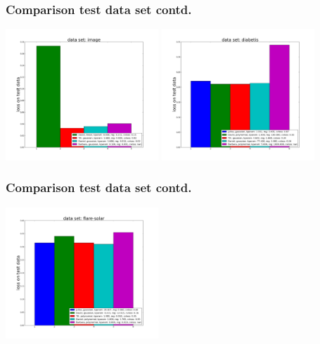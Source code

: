 \begin{frame}
	\frametitle{Comparison test data set contd.}
	\includegraphics[width=5.75cm]{images/ps3_results_image.png}
	\includegraphics[width=5.75cm]{images/ps3_results_diabetis.png}
\end{frame}

\begin{frame}
	\frametitle{Comparison test data set contd.}
	\begin{center}
		\includegraphics[width=5.75cm]{images/ps3_results_flare-solar.png}
	\end{center}
\end{frame}
